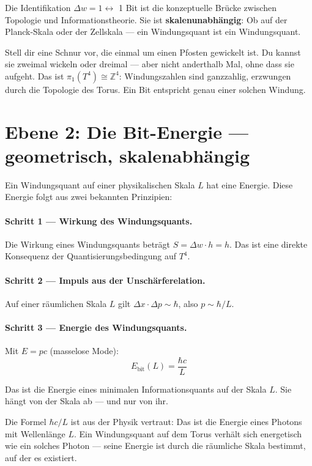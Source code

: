 Die Identifikation $\Delta w = 1 \leftrightarrow$ 1 Bit ist die konzeptuelle
Brücke zwischen Topologie und Informationstheorie. Sie ist
\textbf{skalenunabhängig}: Ob auf der Planck-Skala oder der Zellskala ---
ein Windungsquant ist ein Windungsquant. 

\begin{laierspur}
Stell dir eine Schnur vor, die einmal um einen Pfosten gewickelt ist.
Du kannst sie zweimal wickeln oder dreimal --- aber nicht anderthalb Mal,
ohne dass sie aufgeht. Das ist $\pi_1(T^4) \cong \mathbb{Z}^4$:
Windungszahlen sind ganzzahlig, erzwungen durch die Topologie des Torus.
Ein Bit entspricht genau einer solchen Windung.
\end{laierspur}

\section{Ebene 2: Die Bit-Energie --- geometrisch, skalenabhängig}

Ein Windungsquant auf einer physikalischen Skala $L$ hat eine Energie.
Diese Energie folgt aus zwei bekannten Prinzipien:

\paragraph{Schritt 1 --- Wirkung des Windungsquants.}
Die Wirkung eines Windungsquants beträgt $S = \Delta w \cdot h = h$.
Das ist eine direkte Konsequenz der Quantisierungsbedingung auf $T^4$.

\paragraph{Schritt 2 --- Impuls aus der Unschärferelation.}
Auf einer räumlichen Skala $L$ gilt $\Delta x \cdot \Delta p \sim \hbar$,
also $p \sim \hbar/L$.

\paragraph{Schritt 3 --- Energie des Windungsquants.}
Mit $E = pc$ (masselose Mode):
\[
  \boxed{E_\text{bit}(L) = \frac{\hbar c}{L}}
\]

Das ist die Energie eines minimalen Informationsquants auf der Skala $L$.
Sie hängt von der Skala ab --- und nur von ihr. 

\begin{laierspur}
Die Formel $\hbar c / L$ ist aus der Physik vertraut: Das ist die Energie
eines Photons mit Wellenlänge $L$. Ein Windungsquant auf dem Torus verhält
sich energetisch wie ein solches Photon --- seine Energie ist durch die
räumliche Skala bestimmt, auf der es existiert.
\end{laierspur}

